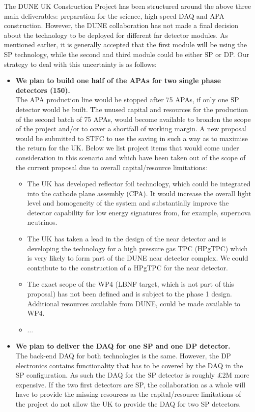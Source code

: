The DUNE UK Construction Project has been structured around the above three main deliverables: preparation for the science, high speed DAQ and APA construction. However, the DUNE collaboration has not made a final decision about the technology to be deployed for different far detector modules. As mentioned earlier, it is generally accepted that the first module will be using the SP technology, while the second and third module could be either SP or DP. Our strategy to deal with this uncertainty is as follows:
\begin{itemize}
    \item {\bf We plan to build one half of the APAs for two single phase detectors (150).}\\ 
    The APA production line would be stopped after 75 APAs, if only one SP detector would be built. The unused capital and resources for the production of the second batch of 75 APAs,
    would become available to broaden the scope of the project and/or to cover a shortfall of working margin. A new proposal would be submitted to STFC to use the saving in such a way as to maximise the return for the UK. Below we list project items that would come under consideration in this scenario and which have been taken out of the scope of the current proposal due to overall capital/resource limitations:
    \begin{itemize}
        \item The UK has developed reflector foil technology, which could be integrated into the cathode plane assembly (CPA). It would increase the overall light level and homogeneity of the system and substantially improve the detector capability for low energy signatures from, for example, supernova neutrinos.
        \item The UK has taken a lead in the design of the near detector and is developing the technology for a high pressure gas TPC (HPgTPC) which is very likely to form part of the DUNE near detector complex. We could contribute to the construction of a HPgTPC for the near detector.
        \item The exact scope of the WP4 (LBNF target, which is not part of this proposal) has not been defined and is subject to the phase 1 design. Additional resources available from DUNE, could be made available to WP4.
        \item ...
    \end{itemize}
    \item {\bf We plan to deliver the DAQ for one SP and one DP detector.}\\ 
    The back-end DAQ for both technologies is the same. However, the DP electronics contains functionality that has to be covered by the DAQ in the SP configuration. As such the DAQ for the SP detector is roughly £2M  more expensive. If the two first detectors are SP, the collaboration as a whole will have to provide the missing resources as the capital/resource limitations of the project do not allow the UK to provide the DAQ for two SP detectors.
\end{itemize}

